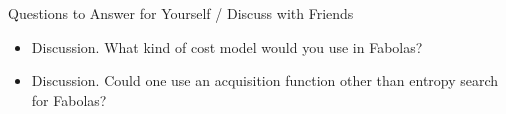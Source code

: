 


\begin{frame}{Questions to Answer for Yourself / Discuss with Friends}

\bigskip

\begin{itemize}
    \item \alert{Discussion.} What kind of cost model would you use in Fabolas?
\medskip
	\item \alert{Discussion.} Could one use an acquisition function other than entropy search for Fabolas?    

\end{itemize}

\end{frame}
